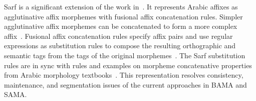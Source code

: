 Sarf is a significant extension of the work in~\citep*{ZaMaColing2012DemosSarf}. 
It represents Arabic affixes as 
agglutinative affix morphemes with fusional affix concatenation rules. 
Simpler agglutinative affix morphemes can be concatenated to form a more complex 
affix~\citep*{Vajda}. 
Fusional affix concatenation rules specify affix pairs and use 
regular expressions  as substitution rules to 
compose the resulting orthographic and semantic tags from the 
tags of the original morphemes~\citep*{Spencer:91}.
The Sarf substitution rules are in sync with 
rules and examples on morpheme concatenative properties from
Arabic morphology textbooks~\citep*{Abd00,Abd001}.
This representation resolves consistency, maintenance, and segmentation 
issues of the current approaches in BAMA and SAMA. 

